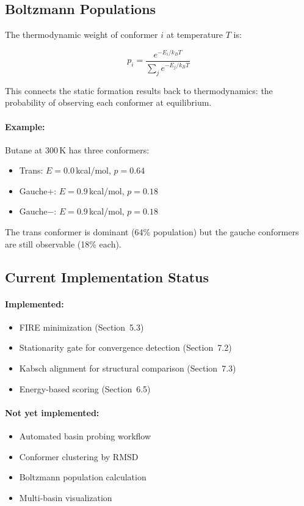 \documentclass[11pt]{article}
\begin{document}
\subsection{Boltzmann Populations}

The thermodynamic weight of conformer $i$ at temperature $T$ is:

\begin{equation}
p_i = \frac{e^{-E_i / k_B T}}{\sum_j e^{-E_j / k_B T}}
\end{equation}

This connects the static formation results back to thermodynamics: the probability of observing each conformer at equilibrium.

\paragraph{Example:} Butane at 300\,K has three conformers:
\begin{itemize}
\item Trans: $E = 0.0$\,kcal/mol, $p = 0.64$
\item Gauche+: $E = 0.9$\,kcal/mol, $p = 0.18$
\item Gauche$-$: $E = 0.9$\,kcal/mol, $p = 0.18$
\end{itemize}

The trans conformer is dominant (64\% population) but the gauche conformers are still observable (18\% each).

\subsection{Current Implementation Status}

\paragraph{Implemented:}
\begin{itemize}
\item FIRE minimization (Section~5.3)
\item Stationarity gate for convergence detection (Section~7.2)
\item Kabsch alignment for structural comparison (Section~7.3)
\item Energy-based scoring (Section~6.5)
\end{itemize}

\paragraph{Not yet implemented:}
\begin{itemize}
\item Automated basin probing workflow
\item Conformer clustering by RMSD
\item Boltzmann population calculation
\item Multi-basin visualization
\end{itemize}
\end{document}

